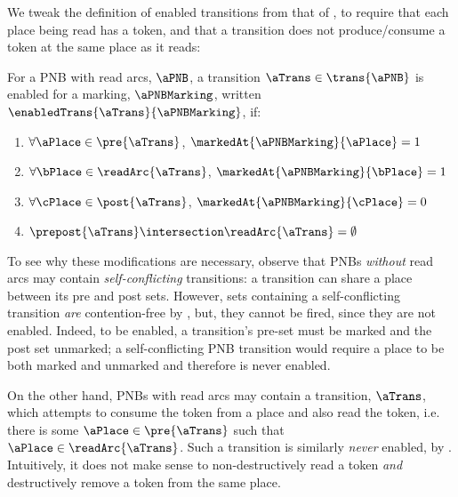 We tweak the definition of enabled transitions from that of
, to require that each place being read has a
token, and that a transition does not produce/consume a token at the same place
as it reads:

\begin{definition}
    \label{defn:enabledTransPNBReadArcs}
    For a PNB with read arcs, $\aPNB$, a transition $\aTrans \in \trans{\aPNB}$
    is enabled for a marking, $\aPNBMarking$, written
    $\enabledTrans{\aTrans}{\aPNBMarking}$, if:
    \begin{multicols}{2}
    \begin{enumerate}
        \item $\forall \aPlace \in \pre{\aTrans}$,
            $\markedAt{\aPNBMarking}{\aPlace} = 1$
        \item $\forall \bPlace \in \readArc{\aTrans}$,
            $\markedAt{\aPNBMarking}{\bPlace} = 1$
        \item $\forall \cPlace \in \post{\aTrans}$,
            $\markedAt{\aPNBMarking}{\cPlace} = 0$
        \item $\prepost{\aTrans} \intersection \readArc{\aTrans} = \emptyset$
    \end{enumerate}
\end{multicols}
\end{definition}

\begin{remark}
To see why these modifications are necessary, observe that PNBs \emph{without}
read arcs may contain \emph{self-conflicting} transitions: a transition can
share a place between its pre and post sets. However, sets containing a
self-conflicting transition \emph{are} contention-free by
, but, they cannot be fired, since they are
not enabled. Indeed, to be enabled, a transition's pre-set must be marked and
the post set unmarked; a self-conflicting PNB transition would require a place
to be both marked and unmarked and therefore is never enabled.

On the other hand, PNBs with read arcs may contain a transition, $\aTrans$,
which attempts to consume the token from a place and also read the token, i.e.
there is some $\aPlace \in \pre{\aTrans}$ such that $\aPlace \in
\readArc{\aTrans}$. Such a transition is similarly \emph{never} enabled, by
. Intuitively, it does not make sense to
non-destructively read a token \emph{and} destructively remove a token from the
same place.
\end{remark}

